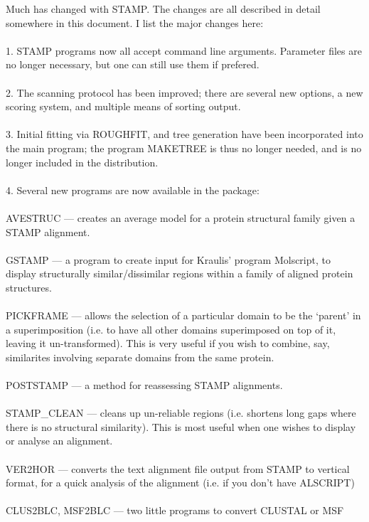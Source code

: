 Much has changed with STAMP.  The changes are all described
in detail somewhere in this document. I list the major changes here:\\
\\
1. STAMP programs now all accept command line arguments.  
Parameter files are no longer necessary, but one can still use 
them if prefered.  \\
\\
2. The scanning protocol has been improved; there
are several new options, a new scoring system, and multiple
means of sorting output.\\
\\
3. Initial fitting via ROUGHFIT, and tree generation have
been incorporated into the main program;  the program MAKETREE is
thus no longer needed, and is no longer included in the 
distribution. \\
\\
4. Several new programs are now available in the package:\\
\\
AVESTRUC  ---  creates an average model for a protein structural
 family given a STAMP alignment.\\
\\
GSTAMP    --- a program to create input for Kraulis' program
 Molscript, to display structurally similar/dissimilar regions
 within a family of aligned protein structures.\\
\\
PICKFRAME --- allows the selection of a particular domain to
 be the `parent' in a superimposition (i.e. to have all other
 domains superimposed on top of it, leaving it un-transformed).  This is
 very useful if you wish to combine, say, similarites involving separate
 domains from the same protein. \\
\\
POSTSTAMP --- a method for reassessing STAMP alignments.\\
\\
STAMP\_CLEAN --- cleans up un-reliable regions (i.e. shortens
 long gaps where there is no structural similarity).  This is
 most useful when one wishes to display or analyse an alignment.\\
\\
VER2HOR --- converts the text alignment file output from STAMP to
vertical format, for a quick analysis of the alignment (i.e. if you
don't have ALSCRIPT)\\
\\
CLUS2BLC, MSF2BLC --- two little programs to convert CLUSTAL or MSF
